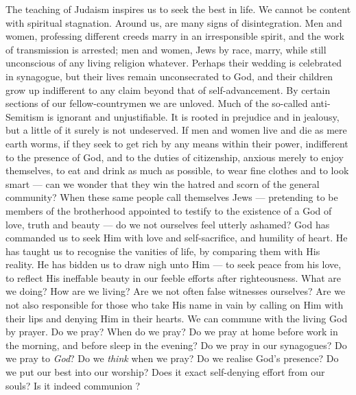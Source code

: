 The teaching of Judaism inspires us to
seek the best in life. We cannot be content
with spiritual stagnation. Around us, are
many signs of disintegration. Men and
women, professing different creeds marry in
an irresponsible spirit, and the work of
transmission is arrested; men and women,
Jews by race, marry, while still unconscious
of any living religion whatever. Perhaps
their wedding is celebrated in synagogue,
but their lives remain unconsecrated to God,
and their children grow up indifferent to any
claim beyond that of self-advancement. By
certain sections of our fellow-countrymen
we are unloved. Much of the so-called
anti-Semitism is ignorant and unjustifiable.
It is rooted in prejudice and in jealousy, but
a little of it surely is not undeserved. If
men and women live and die as mere earth
worms, if they seek to get rich by any
means within their power, indifferent to the
presence of God, and to the duties of
citizenship, anxious merely to enjoy
themselves, to eat and drink as much as possible,
to wear fine clothes and to look smart — can
we wonder that they win the hatred and
scorn of the general community? When
these same people call themselves Jews — 
pretending to be members of the brotherhood
appointed to testify to the existence of
a God of love, truth and beauty — do we
not ourselves feel utterly ashamed? God
has commanded us to seek Him with love
and self-sacrifice, and humility of heart. He
has taught us to recognise the vanities of
life, by comparing them with His reality.
He has bidden us to draw nigh unto Him — 
to seek peace from his love, to reflect His
ineffable beauty in our feeble efforts after
righteousness. What are we doing? How
are we living? Are we not often false
witnesses ourselves? Are we not also responsible
for those who take His name in
vain by calling on Him with their lips and
denying Him in their hearts. We can
commune with the living God by prayer.
Do we pray? When do we pray? Do we
pray at home before work in the morning,
and before sleep in the evening? Do we
pray in our synagogues? Do we pray to
\textsl{God}? Do we \textsl{think} when we pray? Do
we realise God’s presence? Do we put our
best into our worship? Does it exact self-denying
effort from our souls? Is it indeed
communion ?

